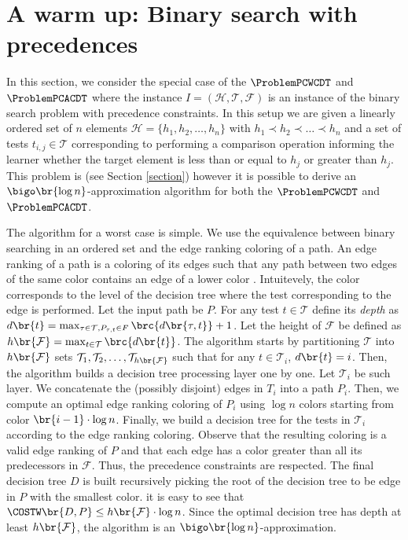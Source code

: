 \section{A warm up: Binary search with precedences}
In this section, we consider the special case of the $\ProblemPCWCDT$ and $\ProblemPCACDT$ where the instance $I = (\mathcal{H}, \mathcal{T}, \mathcal{F})$ is an instance of the binary search problem with precedence constraints. In this setup we are given a linearly ordered set of $n$ elements $\mathcal{H} = \{h_1, h_2, \ldots, h_n\}$ with $h_1 \prec h_2 \prec \ldots \prec h_n$ and a set of tests $t_{i,j}\in \mathcal{T}$ corresponding to performing a comparison operation informing the learner whether the target element is less than or equal to $h_j$ or greater than $h_j$. This problem is \NPhard (see Section \ref{section}) however it is possible to derive an $\bigo\br{\log n}$-approximation algorithm for both the $\ProblemPCWCDT$ and $\ProblemPCACDT$.

The algorithm for a worst case is simple. We use the equivalence between binary searching in an ordered set and the edge ranking coloring of a path. An edge ranking of a path is a coloring of its edges such that any path between two edges of the same color contains an edge of a lower color \cite{OptimalEdgeRankingOfTrees}. Intuitevely, the color corresponds to the level of the decision tree where the test corresponding to the edge is performed. Let the input path be $P$. For any test $t\in\mathcal{T}$ define its \emph{depth} as $d\br{t}=\max_{\tau \in \mathcal{T}, P_{\tau, t}\in F}\brc{d\br{\tau, t}}+1$. Let the height of $\mathcal{F}$ be defined as $h\br{\mathcal{F}}=\max_{t\in \mathcal{T}}\brc{d\br{t}}$. The algorithm starts by partitioning $\mathcal{T}$ into $h\br{\mathcal{F}}$ sets $\mathcal{T}_1, \mathcal{T}_2, \ldots, \mathcal{T}_{h\br{\mathcal{F}}}$ such that for any $t\in \mathcal{T}_i$, $d\br{t}=i$. Then, the algorithm builds a decision tree processing layer one by one. Let $\mathcal{T}_i$ be such layer. We concatenate the (possibly disjoint) edges in $T_i$ into a path $P_i$. Then, we compute an optimal edge ranking coloring of $P_i$ using $\log n$ colors starting from color $\br{i-1}\cdot\log n$. Finally, we build a decision tree for the tests in $\mathcal{T}_i$ according to the edge ranking coloring. Observe that the resulting coloring is a valid edge ranking of $P$ and that each edge has a color greater than all its predecessors in $\mathcal{F}$. Thus, the precedence constraints are respected. The final decision tree $D$ is built recursively picking the root of the decision tree to be edge in $P$ with the smallest color. it is easy to see that $\COSTW\br{D, P}\leq h\br{\mathcal{F}}\cdot \log n$. Since the optimal decision tree has depth at least $h\br{\mathcal{F}}$, the algorithm is an $\bigo\br{\log n}$-approximation.

